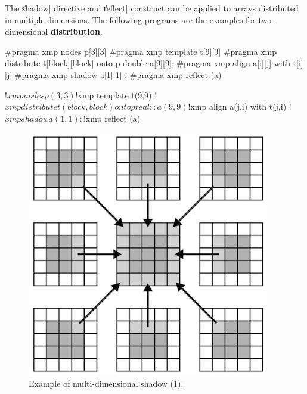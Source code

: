

The \|shadow| directive and \|reflect| construct can be applied to
arrays distributed in multiple dimensions. The following programs are the
examples for two-dimensional {\bf distribution}.

\begin{XCexample}
#pragma xmp nodes p[3][3]
#pragma xmp template t[9][9]
#pragma xmp distribute t[block][block] onto p
double a[9][9];
#pragma xmp align a[i][j] with t[i][j]
#pragma xmp shadow a[1][1]
   :
#pragma xmp reflect (a)
\end{XCexample}

\begin{XFexample}
!$xmp nodes p(3,3)
!$xmp template t(9,9)
!$xmp distribute t(block,block) onto p
real :: a(9,9)
!$xmp align a(j,i) with t(j,i)
!$xmp shadow a(1,1)
   :
!$xmp reflect (a)
\end{XFexample}

\begin{figure}
  \centering
  \includegraphics[width=0.9\columnwidth]{figs/multi1.png}
  \caption{Example of multi-dimensional shadow (1).}
\end{figure}

